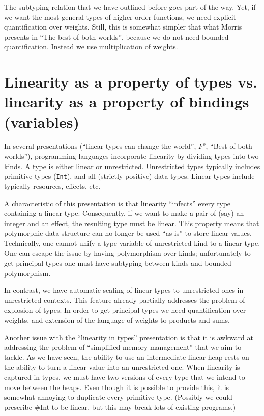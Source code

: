 \documentclass[11pt]{article}
\begin{document}
The subtyping relation that we have outlined before goes part of the
way.  Yet, if we want the most general types of higher order
functions, we need explicit quantification over weights. Still, this
is somewhat simpler that what Morris presents in ``The best of both
worlds'', because we do not need bounded quantification. Instead we
use multiplication of weights.

\section{Linearity as a property of types vs. linearity as a property of bindings (variables)}

In several presentations (``linear types can change the world'',
$F^o$, ``Best of both worlds''), programming languages incorporate
linearity by dividing types into two kinds. A type is either linear
or unrestricted. Unrestricted types typically includes primitive types
(\texttt{Int}), and all (strictly positive) data types. Linear types
include typically resources, effects, etc.

A characteristic of this presentation is that linearity ``infects''
every type containing a linear type. Consequently, if we want to make
a pair of (say) an integer and an effect, the resulting type must be
linear. This property means that polymorphic data structure can no
longer be used ``as is'' to store linear values. Technically, one
cannot unify a type variable of unrestricted kind to a linear
type. One can escape the issue by having polymorphism over kinds;
unfortunately to get principal types one must have subtyping between
kinds and bounded polymorphism.

In contrast, we have automatic scaling of linear types to unrestricted
ones in unrestricted contexts. This feature already partially
addresses the problem of explosion of types. In order to get principal
types we need quantification over weights, and extension of the
language of weights to products and sums.

Another issue with the ``linearity in types'' presentation is that it
is awkward at addressing the problem of ``simplified memory
management'' that we aim to tackle. As we have seen, the ability to
use an intermediate linear heap rests on the ability to turn a linear
value into an unrestricted one. When linearity is captured in types,
we must have two versions of every type that we intend to move between
the heaps. Even though it is possible to provide this, it is somewhat
annoying to duplicate every primitive type. (Possibly we could
prescribe #Int to be linear, but this may break lots of existing
programs.)
\end{document}

